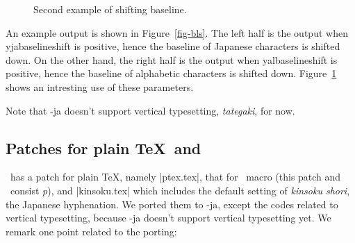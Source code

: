 \documentclass{ajt}
\begin{document}
\begin{description}
\begin{figure}
\caption{Second example of shifting baseline.}
\label{fig-small}
\end{figure}

An example output is shown in Figure~\ref{fig-bls}. The left half is the
	   output when \textsf{yjabaselineshift} is positive, hence the
	   baseline of Japanese characters is shifted down. On the other
	   hand, the right half is the output when
	   \textsf{yalbaselineshift} is positive, hence the baseline of
	   alphabetic characters is shifted down. Figure~\ref{fig-small}
	   shows an intresting use of these parameters.

\end{description}
Note that \LuaTeX-ja doesn't support vertical typesetting, \emph{tategaki}, for now. 

\subsection{Patches for plain \TeX\ and \LaTeXe}
\pTeX\ has a patch for plain \TeX, namely |ptex.tex|, that for \LaTeXe\
macro (this patch and \LaTeXe\ consist \emph{p\LaTeXe}), and
|kinsoku.tex| which includes the default setting of \emph{kinsoku
shori}, the Japanese hyphenation.  We ported them to \LuaTeX-ja, except
the codes related to vertical typesetting, because \LuaTeX-ja doesn't
support vertical typesetting yet. We remark one point related to the
porting:
\end{document}
